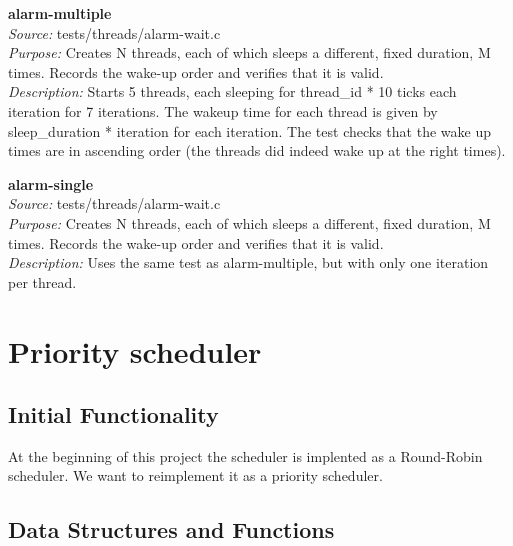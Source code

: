     \textbf{alarm-multiple}\\
    \textit{Source:} tests/threads/alarm-wait.c\\
    \textit{Purpose:} Creates N threads, each of which sleeps a different, fixed duration, M times. Records the wake-up order and verifies that it is valid.\\
    \textit{Description:} Starts 5 threads, each sleeping for thread\_id * 10 ticks each iteration for 7 iterations. The wakeup time for each thread is given by sleep\_duration * iteration for each iteration. The test checks that the wake up times are in ascending order (the threads did indeed wake up at the right times).

    \textbf{alarm-single}\\
    \textit{Source:} tests/threads/alarm-wait.c\\
    \textit{Purpose:} Creates N threads, each of which sleeps a different, fixed duration, M times. Records the wake-up order and verifies that it is valid.\\
    \textit{Description:} Uses the same test as alarm-multiple, but with only one iteration per thread.

\section{Priority scheduler}

    \subsection{Initial Functionality}

	At the beginning of this project the scheduler is implented as a Round-Robin scheduler. We want to reimplement it as a priority scheduler.		

    \subsection{Data Structures and Functions}

